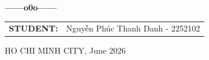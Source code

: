 \begin{titlepage}
\begin{center}
    \textbf{------o0o------}

    
    \begin{tabular}{l l}
        \textbf{STUDENT:} & Nguyễn Phúc Thanh Danh - 2252102

    \end{tabular}

    \vspace{1cm}

    HO CHI MINH CITY, June 2026

\end{center}

\end{titlepage}